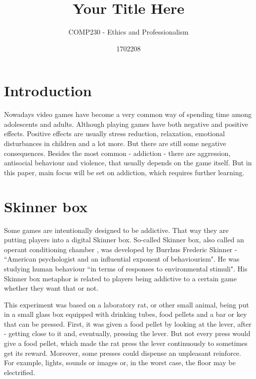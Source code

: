 \documentclass{scrartcl}
\title{Your Title Here}
\subtitle{COMP230 - Ethics and Professionalism}
\author{1702208}
\begin{document}
\maketitle

\section{Introduction}

Nowadays video games have become a very common way of spending time among adolescents and adults. Although playing games have both negative and positive effects. Positive effects are usually stress reduction\cite{russoniello2009effectiveness}, relaxation\cite{wack2009relationships}, emotional disturbances in children\cite{jones2014gaming}\cite{hull2009computer} and a lot more. But there are still some negative consequences. Besides the most common - addiction - there are aggression, antisocial behaviour and violence, that usually depends on the game itself. But in this paper, main focus will be set on addiction, which requires further learning. 

\section{Skinner box}

Some games are intentionally designed to be addictive. That way they are putting players into a digital Skinner box. So-called Skinner box, also called an operant conditioning chamber \cite{skinnerbox}, was developed by Burrhus Frederic Skinner - ``American psychologist and an influential exponent of behaviourism"\cite{bfskinner}. He was studying human behaviour ``in terms of responses to environmental stimuli"\cite{bfskinner}. His Skinner box metaphor is related to players being addictive to a certain game whether they want that or not. 

This experiment was based on a laboratory rat, or other small animal, being put in a small glass box equipped with drinking tubes, food pellets and a bar or key that can be pressed\cite{skinnerbox}\cite{nyskinnerbox}. First, it was given a food pellet by looking at the lever, after - getting close to it and, eventually, pressing the lever. But not every press would give a food pellet, which made the rat press the lever continuously to sometimes get its reward. Moreover, some presses could dispense an unpleasant reinforce. For example, lights, sounds or images or, in the worst case, the floor may be electrified\cite{skinnerbox}.
\end{document}
